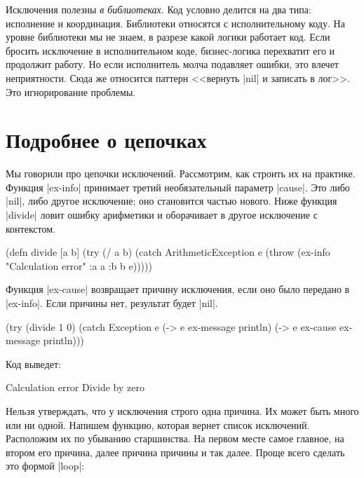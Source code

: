 Исключения полезны \emph{в библиотеках}. Код условно делится на два типа:
исполнение и координация. Библиотеки относятся с исполнительному коду. На уровне
библиотеки мы не знаем, в разрезе какой логики работает код. Если бросить
исключение в исполнительном коде, бизнес-логика перехватит его и продолжит
работу. Но если исполнитель молча подавляет ошибки, это влечет
неприятности. Сюда же относится паттерн <<вернуть \spverb|nil| и записать в
лог>>. Это игнорирование проблемы.

\section{Подробнее о цепочках}

Мы говорили про цепочки исключений. Рассмотрим, как строить их на
практике. Функция \spverb|ex-info| принимает третий необязательный параметр
\spverb|cause|. Это либо \spverb|nil|, либо другое исключение; оно становится
частью нового. Ниже функция \spverb|divide| ловит ошибку арифметики и
оборачивает в другое исключение с контекстом.

\label{re-throw-example}

\begin{english}
  \begin{clojure}
(defn divide [a b]
  (try
    (/ a b)
    (catch ArithmeticException e
      (throw (ex-info
              "Calculation error"
              {:a a :b b}
              e)))))
  \end{clojure}
\end{english}

Функция \spverb|ex-cause| возвращает причину исключения, если оно было передано
в \spverb|ex-info|. Если причины нет, результат будет \spverb|nil|.

\begin{english}
  \begin{clojure}
(try
  (divide 1 0)
  (catch Exception e
    (-> e ex-message println)
    (-> e ex-cause ex-message println)))
  \end{clojure}
\end{english}

\noindent
Код выведет:

\begin{english}
  \begin{text}
Calculation error
Divide by zero
  \end{text}
\end{english}

Нельзя утверждать, что у исключения строго одна причина. Их может быть много или
ни одной. Напишем функцию, которая вернет список исключений. Расположим их по
убыванию старшинства. На первом месте самое главное, на втором его причина,
далее причина причины и так далее. Проще всего сделать это формой \spverb|loop|:

